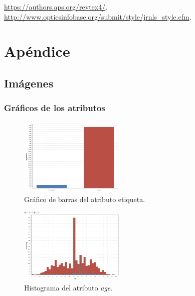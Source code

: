 \documentclass[osajnl,twocolumn,showpacs,superscriptaddress,10pt,floatfix]{revtex4-1} %
\begin{document}
\begin{thebibliography}{99}

 \url{https://authors.aps.org/revtex4/}.
 \url{http://www.opticsinfobase.org/submit/style/jrnls_style.cfm}.

\end{thebibliography}

\clearpage

\onecolumngrid

\section{Apéndice}

\subsection{Imágenes} \label{apendix:images}

\subsubsection{Gráficos de los atributos} \label{apendix:images:attr}

\twocolumngrid

\begin{figure}[H]
    \centering
    \includegraphics[width=0.45\textwidth]{analysis/bars_hypothyroid}
    \caption{Gráfico de barras del atributo etiqueta.}
    \label{figure:bars_hypothyroid}
\end{figure}

\begin{figure}[H]
    \centering
    \includegraphics[width=0.45\textwidth]{analysis/histogram_age}
    \caption{Histograma del atributo \textit{age}.}
    \label{figure:histogram_age}
\end{figure}
\end{document}
